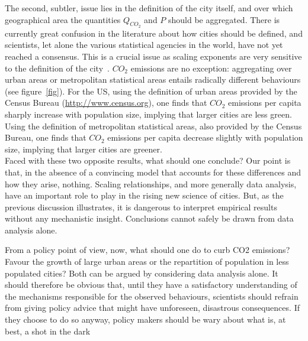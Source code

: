 The second, subtler, issue lies in the definition of the city itself, and over which
geographical area the quantities $Q_{CO_2}$ and $P$ should be aggregated. There is currently great
confusion in the literature about how cities should be defined, and scientists, let alone the
various statistical agencies in the world, have not yet reached a consensus. This is a crucial
issue as scaling exponents are very sensitive to the definition of the city~\cite{Arcaute:2013}. $CO_2$ emissions are no exception: aggregating over urban areas or metropolitan
statistical areas entails radically different behaviours (see figure~\ref{fig}). For the US, using the
definition of urban areas provided by the Census Bureau (\url{http://www.census.org}), one finds
that $CO_2$ emissions per capita sharply increase with population size, implying that larger
cities are less green. Using the definition of metropolitan statistical areas, also provided by
the Census Bureau, one finds that $CO_2$ emissions per capita decrease slightly with population
size, implying that larger cities are greener.\\



Faced with these two opposite results, what should one conclude? Our point is that, in
the absence of a convincing model that accounts for these differences and how they arise,
nothing. Scaling relationships, and more generally data analysis, have an important role
to play in the rising new science of cities. But, as the previous discussion illustrates, it is
dangerous to interpret empirical results without any mechanistic insight. Conclusions cannot
safely be drawn from data analysis alone.

From a policy point of view, now, what should one do to curb CO2 emissions? Favour
the growth of large urban areas or the repartition of population in less populated cities?
Both can be argued by considering data analysis alone. It should therefore be obvious that,
until they have a satisfactory understanding of the mechanisms responsible for the observed
behaviours, scientists should refrain from giving policy advice that might have unforeseen,
disastrous consequences. If they choose to do so anyway, policy makers should be wary
about what is, at best, a shot in the dark
